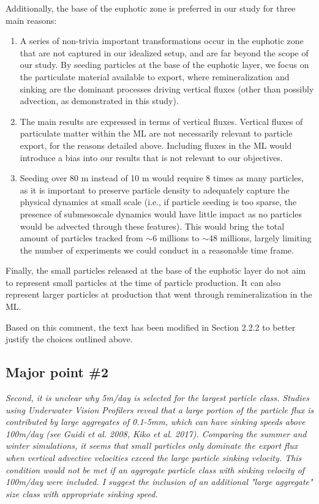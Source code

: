 \documentclass[12pt,letter]{article}
\begin{document}
Additionally, the base of the euphotic zone is preferred in our study for three main reasons: 
			\begin{enumerate}
				\item A series of non-trivia important transformations occur in the euphotic zone \citep[e.g., grazing, material packaging, and many others; see][for example]{Denman_1999} that are not captured in our idealized setup, and are far beyond the scope of our study. By seeding particles at the base of the euphotic layer, we focus on the particulate material available to export, where remineralization and sinking are the dominant processes driving vertical fluxes (other than possibly advection, as demonstrated in this study). 
				\item The main results are expressed in terms of vertical fluxes. Vertical fluxes of particulate matter within the ML are not necessarily relevant to particle export, for the reasons detailed above. Including fluxes in the ML would introduce a bias into our results that is not relevant to our objectives.
				\item Seeding over 80 m instead of 10 m would require 8 times as many particles, as it is important to preserve particle density to adequately capture the physical dynamics at small scale (i.e., if particle seeding is too sparse, the presence of submesoscale dynamics would have little impact as no particles would be advected through these features). This would bring the total amount of particles tracked from $\sim$6 millions to $\sim$48 millions, largely limiting the number of experiments we could conduct in a reasonable time frame.
			\end{enumerate}

Finally, the small particles released at the base of the euphotic layer do not aim to represent small particles at the time of particle production. It can also represent larger particles at production that went through remineralization in the ML.

Based on this comment, the text has been modified in Section 2.2.2 to better justify the choices outlined above.\\

\subsection*{Major point \#2}
\textit{Second, it is unclear why 5m/day is selected for the largest particle class. Studies using Underwater Vision Profilers reveal that a large portion of the particle flux is contributed by large aggregates of 0.1-5mm, which can have sinking speeds above 100m/day (see Guidi et al. 2008, Kiko et al. 2017). Comparing the summer and winter simulations, it seems that small particles only dominate the export flux when vertical advective velocities exceed the large particle sinking velocity. This condition would not be met if an aggregate particle class with sinking velocity of 100m/day were included. I suggest the inclusion of an additional "large aggregate" size class with appropriate sinking speed.\\}
\end{document}
